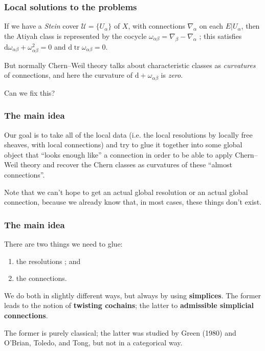 \documentclass{beamer}
\begin{document}
  \begin{frame}\frametitle{Local solutions to the problems}
    \begin{lemma}
      If we have a \emph{Stein} cover $\mathscr{U}=\{U_\alpha\}$ of $X$, with connections $\nabla_\alpha$ on each $E|U_\alpha$, then the Atiyah class is represented by the cocycle $\omega_{\alpha\beta}=\nabla_\beta-\nabla_\alpha$ ; this satisfies $\mathrm{d}\omega_{\alpha\beta}+\omega_{\alpha\beta}^2=0$ and $\mathrm{d}\operatorname{tr}\omega_{\alpha\beta}=0$.
    \end{lemma}

    \pause

    But normally Chern--Weil theory talks about characteristic classes as \emph{curvatures} of connections, and here the curvature of $\mathrm{d}+\omega_{\alpha\beta}$ is \emph{zero}.

    Can we fix this?
  \end{frame}

  \begin{frame}\frametitle{The main idea}
    Our goal is to take all of the local data (i.e. the local resolutions by locally free sheaves, with local connections) and try to glue it together into some global object that ``looks enough like'' a connection in order to be able to apply Chern--Weil theory and recover the Chern classes as curvatures of these ``almost connections''.

    \pause

    Note that we can't hope to get an actual global resolution or an actual global connection, because we already know that, in most cases, these things don't exist.
  \end{frame}

  \begin{frame}\frametitle{The main idea}
    There are two things we need to glue:
    \begin{enumerate}
      \item the resolutions ; and
      \item the connections.
    \end{enumerate}

    We do both in slightly different ways, but always by using \textbf{simplices}.
    The former leads to the notion of \textbf{twisting cochains}; the latter to \textbf{admissible simplicial connections}.

    \pause

    The former is purely classical; the latter was studied by Green (1980) and O'Brian, Toledo, and Tong, but not in a categorical way.
  \end{frame}
\end{document}

